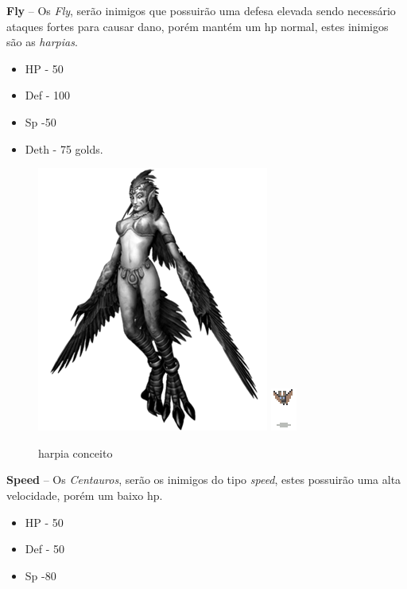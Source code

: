 \documentclass[11pt]{article} %
\begin{document}
\newpage

\textbf{{\large Fly}} – Os \textit{Fly}, serão inimigos que possuirão uma defesa elevada sendo necessário ataques fortes para causar dano, porém mantém um hp normal, estes inimigos são as \textit{harpias}.
\begin{itemize}
\item HP - 50
\item Def - 100
\item Sp -50
\item Deth - 75 golds.
\end{itemize}

\begin{figure}[!htp]
\centering
\includegraphics[scale=0.75]{res/characters/harpia.png} \quad
\includegraphics[scale=2]{res/characters/bat.png} 
\caption{harpia conceito}
\label{cyclops}
\end{figure}

\textbf{{\large Speed}} – Os \textit{Centauros}, serão os inimigos do tipo \textit{speed}, estes possuirão uma alta velocidade, porém um baixo hp.
\begin{itemize}
\item HP - 50
\item Def - 50
\item Sp -80
\end{itemize}
\end{document}
